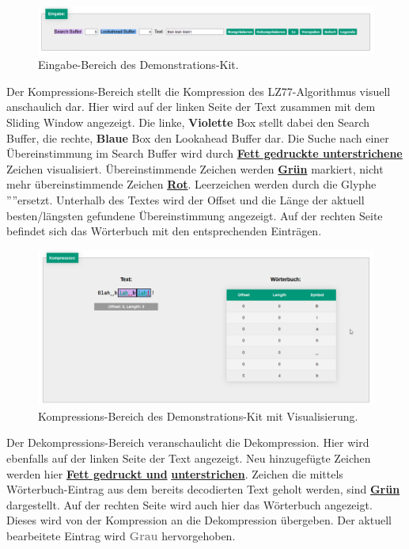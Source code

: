 \documentclass[10pt, a4paper]{article}
\begin{document}
\begin{figure}[H]
    \centering
    \includegraphics[scale=0.45]{pictures/Eingabe.png}
    \caption{Eingabe-Bereich des Demonstrations-Kit.}
\end{figure}

\noindent
Der Kompressions-Bereich stellt die Kompression des LZ77-Algorithmus visuell anschaulich dar. Hier wird auf der linken Seite der Text zusammen mit dem Sliding Window angezeigt. Die linke, \textcolor{htmlviolet}{\textbf{Violette}} Box stellt dabei den Search Buffer, die rechte, \textcolor{htmlblue}{\textbf{Blaue}} Box den Lookahead Buffer dar. Die Suche nach einer Übereinstimmung im Search Buffer wird durch \underline{\textbf{Fett gedruckte unterstrichene}} Zeichen visualisiert. Übereinstimmende Zeichen werden \textcolor{htmlgreen}{\underline{\textbf{Grün}}} markiert, nicht mehr übereinstimmende Zeichen \textcolor{htmlred}{\underline{\textbf{Rot}}}. Leerzeichen werden durch die Glyphe ''\textvisiblespace ''\space ersetzt. Unterhalb des Textes wird der Offset und die Länge der aktuell besten/längsten gefundene Übereinstimmung angezeigt. Auf der rechten Seite befindet sich das Wörterbuch mit den entsprechenden Einträgen.

\begin{figure}[H]
    \centering
    \includegraphics[scale=0.45]{pictures/Kompression.png}
    \caption{Kompressions-Bereich des Demonstrations-Kit mit Visualisierung.}
\end{figure}

\noindent
Der Dekompressions-Bereich veranschaulicht die Dekompression. Hier wird ebenfalls auf der linken Seite der Text angezeigt. Neu hinzugefügte Zeichen werden hier \underline{\textbf{Fett gedruckt und}} \underline{\textbf{unterstrichen}}. Zeichen die mittels Wörterbuch-Eintrag aus dem bereits decodierten Text geholt werden, sind \textcolor{htmlgreen}{\underline{\textbf{Grün}}} dargestellt. Auf der rechten Seite wird auch hier das Wörterbuch angezeigt. Dieses wird von der Kompression an die Dekompression übergeben. Der aktuell bearbeitete Eintrag wird \textcolor{gray}{\textbf{Grau}} hervorgehoben.
\end{document}
